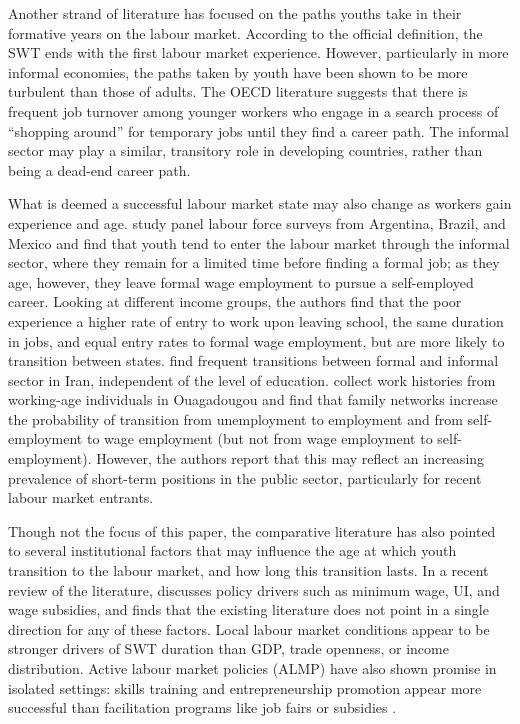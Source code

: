 \documentclass[
  a4paper, twoside, 12pt]{book}
\begin{document}
Another strand of literature has focused on the paths youths take in their formative years on the labour market. According to the official definition, the SWT ends with the first labour market experience. However, particularly in more informal economies, the paths taken by youth have been shown to be more turbulent than those of adults. The OECD literature suggests that there is frequent job turnover among younger workers who engage in a search process of ``shopping around'' for temporary jobs until they find a career path. The informal sector may play a similar, transitory role in developing countries, rather than being a dead-end career path.

What is deemed a successful labour market state may also change as workers gain experience and age. \textcite{cunningham2011} study panel labour force surveys from Argentina, Brazil, and Mexico and find that youth tend to enter the labour market through the informal sector, where they remain for a limited time before finding a formal job; as they age, however, they leave formal wage employment to pursue a self-employed career. Looking at different income groups, the authors find that the poor experience a higher rate of entry to work upon leaving school, the same duration in jobs, and equal entry rates to formal wage employment, but are more likely to transition between states. \textcite{egel2010} find frequent transitions between formal and informal sector in Iran, independent of the level of education. \textcite{nordman2014} collect work histories from working-age individuals in Ouagadougou and find that family networks increase the probability of transition from unemployment to employment and from self-employment to wage employment (but not from wage employment to self-employment). However, the authors report that this may reflect an increasing prevalence of short-term positions in the public sector, particularly for recent labour market entrants.

Though not the focus of this paper, the comparative literature has also pointed to several institutional factors that may influence the age at which youth transition to the labour market, and how long this transition lasts. In a recent review of the literature, \textcite{nilsson2019} discusses policy drivers such as minimum wage, UI, and wage subsidies, and finds that the existing literature does not point in a single direction for any of these factors. Local labour market conditions appear to be stronger drivers of SWT duration than GDP, trade openness, or income distribution. Active labour market policies (ALMP) have also shown promise in isolated settings: skills training and entrepreneurship promotion appear more successful than facilitation programs like job fairs or subsidies \autocite{mckenzie2017}.
\end{document}
